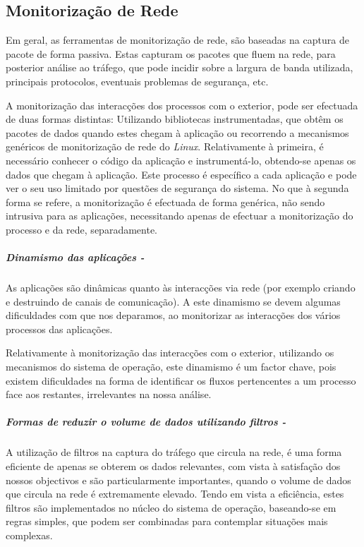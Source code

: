 \subsection{Monitorização de Rede}\label{sub:network_monitoring}

Em geral, as ferramentas de monitorização de rede, são baseadas na captura de pacote de forma passiva.
Estas capturam os pacotes que fluem na rede, para posterior análise ao tráfego, que pode incidir sobre a largura de banda utilizada, principais protocolos, eventuais problemas de segurança, etc.

A monitorização das interacções dos processos com o exterior, pode ser efectuada de duas formas distintas: Utilizando bibliotecas instrumentadas, que obtêm os pacotes de dados quando estes chegam à aplicação ou recorrendo a mecanismos genéricos de monitorização de rede do \textit{Linux}. 
Relativamente à primeira, é necessário conhecer o código da aplicação e instrumentá-lo, obtendo-se apenas os dados que chegam à aplicação.
Este processo é específico a cada aplicação e pode ver o seu uso limitado por questões de segurança do sistema.
No que à segunda forma se refere, a monitorização é efectuada de forma genérica, não sendo intrusiva para as aplicações, necessitando apenas de efectuar a monitorização do processo e da rede, separadamente. 

\subparagraph*{Dinamismo das aplicações - }
As aplicações são dinâmicas quanto às interacções via rede (por exemplo criando e destruindo de canais de comunicação).
A este dinamismo se devem algumas dificuldades com que nos deparamos, ao monitorizar as interacções dos vários processos das aplicações.

Relativamente à monitorização das interacções com o exterior, utilizando os mecanismos do sistema de operação, este dinamismo é um factor chave, pois existem dificuldades na forma de identificar os fluxos pertencentes a um processo face aos restantes, irrelevantes na nossa análise.

\subparagraph*{Formas de reduzir o volume de dados utilizando filtros - }
A utilização de filtros na captura do tráfego que circula na rede, é uma forma eficiente de apenas se obterem os dados relevantes, com vista à satisfação dos nossos objectivos e são particularmente importantes, quando o volume de dados que circula na rede é extremamente elevado.
Tendo em vista a eficiência, estes filtros são implementados no núcleo do sistema de operação, baseando-se em regras simples, que podem ser combinadas para contemplar situações mais complexas.


